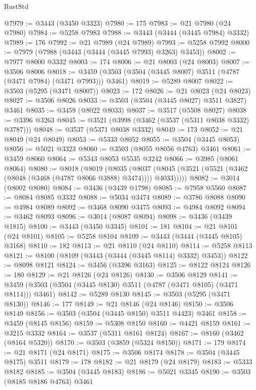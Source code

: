 \begin{lexlean}{RustStd}
\begin{coremodule}
@7979 := @3443 (@3450 @3323)
@7980 := 175
@7983 := @21 @7980 (@24 @7980)
@7984 := @5258 @7983
@7988 := @3443 (@3444 (@3445 @7984) @3332)
@7989 := 176
@7992 := @21 @7989 (@24 @7989)
@7993 := @5258 @7992
@8000 := @7979 (@7988 (@3443 (@3444 (@3445 @7993) @3263) @3453))
@8002 := @7977 @8000 @3332
@8003 := 174
@8006 := @21 @8003 (@24 @8003)
@8007 := @3506 @8006
@8018 := @3459 (@3503 (@3504 (@3445 @8007) @3511 (@4787 (@3471 @7984) (@3471 @7993))) @3461)
@8019 := @5289 @8007
@8022 := @3503 (@5295 (@3471 @8007))
@8023 := 172
@8026 := @21 @8023 (@24 @8023)
@8027 := @3506 @8026
@8033 := @3503 (@3504 (@3445 @8027) @3511 @3827) @3461
@8035 := @3459 (@8022 @8033)
@8037 := @3517 (@5508 @8027)
@8038 := @3396 @3263
@8045 := @3521 (@3998 (@3462 (@3537 (@5311 @8038 @3332) @3787)))
@8048 := @3537 (@5371 @8038 @3332)
@8049 := 173
@8052 := @21 @8049 (@24 @8049)
@8053 := @5333 @8052
@8055 := @3504 (@3445 @8053)
@8056 := @5021 @3323
@8060 := @3503 (@8055 @8056 @4763) @3461
@8061 := @3459 @8060
@8064 := @5343 @8053 @5535 @3242
@8066 := @3985 (@8061 @8064)
@8080 := @8018
    (@8019
      (@8035
        (@8037 (@8045 (@3521 (@5521 (@3462 (@8048 (@3468 (@4787 @8066 @3888) @3474)))) @4033)))))
@8082 := @3014 (@8002 @8080)
@8084 := @3436 (@3439 @1798)
@8085 := @7958 @5560
@8087 := @8084 @8085 @3332
@8088 := @5034 @3474
@8089 := @3786 @8088
@8090 := @4984 @8089
@8092 := @3468 @8090 @3475
@8093 := @4984 @8092
@8094 := @3462 @8093
@8096 := @3014 (@8087 @8094)
@8098 := @3436 (@3439 @1815)
@8100 := @3443 (@3450 @3345)
@8101 := 181
@8104 := @21 @8101 (@24 @8101)
@8105 := @5258 @8104
@8109 := @3443 (@3444 (@3445 @8105) @3168)
@8110 := 182
@8113 := @21 @8110 (@24 @8110)
@8114 := @5258 @8113
@8121 := @8100 (@8109 (@3443 (@3444 (@3445 @8114) @3332) @3453))
@8122 := @8098 @8121
@8124 := @3456 (@3396 @3163)
@8125 := @8122 @8124
@8126 := 180
@8129 := @21 @8126 (@24 @8126)
@8130 := @3506 @8129
@8141 := @3459 (@3503 (@3504 (@3445 @8130) @3511 (@4787 (@3471 @8105) (@3471 @8114))) @3461)
@8142 := @5289 @8130
@8145 := @3503 (@5295 (@3471 @8130))
@8146 := 177
@8149 := @21 @8146 (@24 @8146)
@8150 := @3506 @8149
@8156 := @3503 (@3504 (@3445 @8150) @3511 @4423) @3461
@8158 := @3459 (@8145 @8156)
@8159 := @5308 @8150
@8160 := @4421 @8159
@8161 := @3215 @3332
@8164 := @3537 (@5311 @8161 @8124)
@8167 := @8160 (@3462 (@8164 @5320))
@8170 := @3503 (@3859 (@5324 @8150))
@8171 := 179
@8174 := @21 @8171 (@24 @8171)
@8175 := @3506 @8174
@8178 := @3504 (@3445 @8175) @3511
@8179 := 178
@8182 := @21 @8179 (@24 @8179)
@8183 := @5333 @8182
@8185 := @3504 (@3445 @8183)
@8186 := @5021 @3345
@8190 := @3503 (@8185 @8186 @4763) @3461

\end{coremodule}
\end{lexlean}
